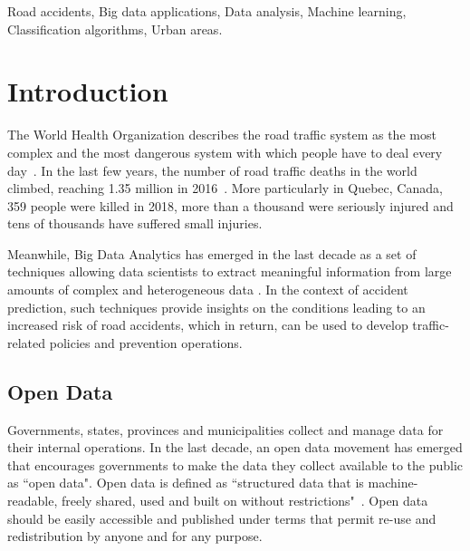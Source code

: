 \documentclass[conference]{IEEEtran}
\begin{document}
\begin{IEEEkeywords}
Road accidents, Big data applications, Data analysis, Machine learning, Classification algorithms, Urban areas. 
\end{IEEEkeywords}


\section{Introduction}

The World Health Organization describes the road traffic system as the most
complex and the most dangerous system with which people have to deal every
day~\cite{Peden2004}. In the last few years, the number of road traffic deaths in the world climbed, reaching 1.35 million in 2016~\cite{road_safety_report}. More particularly in Quebec, Canada, 359 people were killed in 2018, more than a thousand were seriously injured and tens of thousands have suffered small injuries\cite{saaq}.

Meanwhile, Big Data Analytics has emerged in the last decade as a set of techniques allowing data scientists to extract meaningful information from large amounts of complex and heterogeneous data \cite{Gandomi2015}. In the context of accident prediction, such techniques provide insights on the conditions leading to an increased risk of road accidents, which in return, can be used to develop traffic-related policies and prevention operations. 


\subsection{Open Data}

Governments, states, provinces and municipalities collect and manage data for their internal operations. In the last decade, an open data movement has emerged that encourages governments to make the data they collect available to the public as ``open data".
Open data is defined as ``structured data that is machine-readable, freely shared, used and built on without restrictions"~\cite{opendata101}. Open data should be easily accessible and published under terms that permit re-use and redistribution by anyone and for any purpose.
\end{document}

